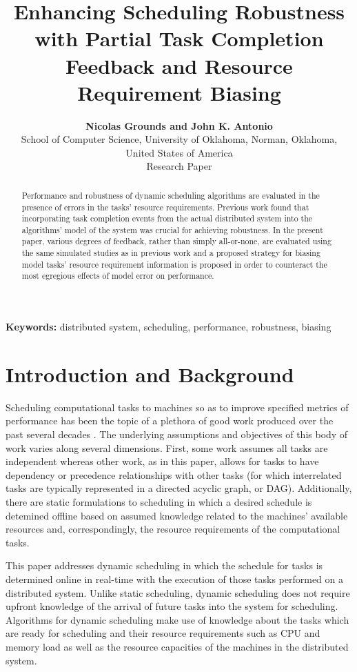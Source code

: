\documentclass[10pt]{csce}
\title{\bf Enhancing Scheduling Robustness with Partial Task Completion
Feedback and Resource Requirement Biasing}
\author{
{\bfseries Nicolas Grounds and John K. Antonio}\\
School of Computer Science, University of Oklahoma, Norman, Oklahoma, United States of America\\
Research Paper
}
\begin{document}
\maketitle                        %

\begin{abstract}
Performance and robustness of dynamic scheduling algorithms are evaluated in
the presence of errors in the tasks' resource requirements.  Previous work
found that incorporating task completion events from the actual distributed
system into the algorithms' model of the system was crucial for achieving
robustness.  In the present paper, various degrees of feedback, rather than
simply all-or-none, are evaluated using the same simulated studies as in
previous work and a proposed strategy for biasing model tasks' resource
requirement information is proposed in order to counteract the most egregious
effects of model error on performance.
\end{abstract}


\vspace{1em}
\noindent\textbf{Keywords:}
 {\small distributed system, scheduling, performance, robustness, biasing}


\section{Introduction and Background}
\label{sec:Intro}

Scheduling computational tasks to machines so as to improve specified metrics
of performance has been the topic of a plethora of good work produced over the
past several decades \cite{taxonomy}. The underlying assumptions and objectives
of this body of work varies along several dimensions. First, some work assumes
all tasks are independent whereas other work, as in this paper, allows for
tasks to have dependency or precedence relationships with other tasks (for
which interrelated tasks are typically represented in a directed acyclic graph,
or DAG). Additionally, there are static formulations to scheduling in which a
desired schedule is detemined offline based on assumed knowledge related to the
machines' available resources and, correspondingly, the resource requirements
of the computational tasks.

This paper addresses dynamic scheduling in which the schedule for
tasks is determined online in real-time with the execution of those tasks
performed on a distributed system. Unlike static scheduling, dynamic scheduling
does not require upfront knowledge of the arrival of future tasks into the
system for scheduling. Algorithms for dynamic scheduling make use of knowledge
about the tasks which are ready for scheduling and their resource requirements
such as CPU and memory load as well as the resource capacities of the machines
in the distributed system.
\end{document}
